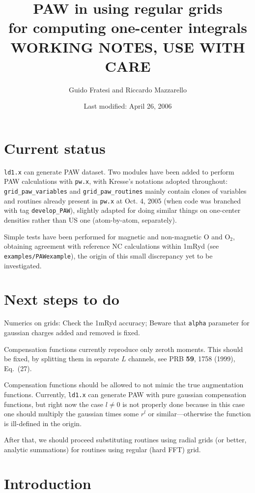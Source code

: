 \documentclass[a4paper,twocolumn,12pt]{article}
\title{PAW in \var{pw.x} using regular grids\\for computing one-center
integrals\\WORKING NOTES, USE WITH CARE}
\author{Guido Fratesi and Riccardo Mazzarello}
\date{Last modified: April 26, 2006}
\newcommand{\var}[1]{{\tt #1}}
\begin{document}
\maketitle

\section*{Current status}

\var{ld1.x} can generate PAW dataset.  Two modules have been added to
perform PAW calculations with \var{pw.x}, with Kresse's notations
adopted throughout: \var{grid\_paw\_variables} and
\var{grid\_paw\_routines} mainly contain clones of variables and
routines already present in \var{pw.x} at Oct. 4, 2005 (when code was
branched with tag \var{develop\_PAW}), slightly adapted for doing
similar things on one-center densities rather than US one
(atom-by-atom, separately).

Simple tests have been performed for magnetic and non-magnetic O and O$_2$,
obtaining agreement with reference NC calculations within 1mRyd (see
\var{examples/PAWexample}), the origin of this small discrepancy yet
to be investigated.

\section*{Next steps to do}

Numerics on grids: Check the 1mRyd accuracy; Beware that \var{alpha}
parameter for gaussian charges added and removed is fixed.

Compensation functions currently reproduce only zeroth moments.  This
should be fixed, by splitting them in separate $L$ channels, see PRB
{\bf 59}, 1758 (1999), Eq.~(27).

Compensation functions should be allowed to not mimic the true
augmentation functions.  Currently, \var{ld1.x} can generate PAW with
pure gaussian compensation functions, but right now the case $l\neq0$
is not properly done because in this case one should multiply the
gaussian times some $r^l$ or similar---otherwise the function is
ill-defined in the origin.

After that, we should proceed substituting routines using radial grids
(or better, analytic summations) for routines using regular (hard FFT)
grid.

\section*{Introduction}
\end{document}
